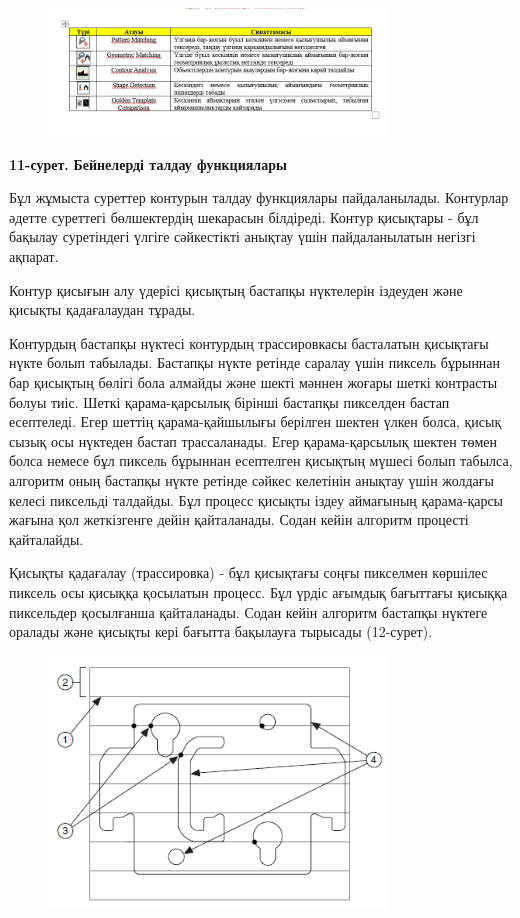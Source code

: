 \begin{figure}[H]
	\centering
	\includegraphics[width=0.8\textwidth]{media/ict2/image179}
	\caption*{}
\end{figure}
{\bfseries 11-сурет.}
{\bfseries Бейнелерді талдау функциялары}

Бұл жұмыста суреттер контурын талдау функциялары пайдаланылады.
Контурлар әдетте суреттегі бөлшектердің шекарасын білдіреді. Контур
қисықтары - бұл бақылау суретіндегі үлгіге сәйкестікті анықтау үшін
пайдаланылатын негізгі ақпарат.

Контур қисығын алу үдерісі қисықтың бастапқы нүктелерін іздеуден және
қисықты қадағалаудан тұрады.

Контурдың бастапқы нүктесі контурдың трассировкасы басталатын қисықтағы
нүкте болып табылады. Бастапқы нүкте ретінде саралау үшін пиксель
бұрыннан бар қисықтың бөлігі бола алмайды және шекті мәннен жоғары шеткі
контрасты болуы тиіс. Шеткі қарама-қарсылық бірінші бастапқы пикселден
бастап есептеледі. Егер шеттің қарама-қайшылығы берілген шектен үлкен
болса, қисық сызық осы нүктеден бастап трассаланады. Егер
қарама-қарсылық шектен төмен болса немесе бұл пиксель бұрыннан
есептелген қисықтың мүшесі болып табылса, алгоритм оның бастапқы нүкте
ретінде сәйкес келетінін анықтау үшін жолдағы келесі пиксельді талдайды.
Бұл процесс қисықты іздеу аймағының қарама-қарсы жағына қол жеткізгенге
дейін қайталанады. Содан кейін алгоритм процесті қайталайды.

Қисықты қадағалау (трассировка) - бұл қисықтағы соңғы пикселмен көршілес
пиксель осы қисыққа қосылатын процесс. Бұл үрдіс ағымдық бағыттағы
қисыққа пиксельдер қосылғанша қайталанады. Содан кейін алгоритм бастапқы
нүктеге оралады және қисықты кері бағытта бақылауға тырысады (12-сурет).


\begin{figure}[H]
	\centering
	\includegraphics[width=0.8\textwidth]{media/ict2/image180.gif}
	\caption*{}
\end{figure}


